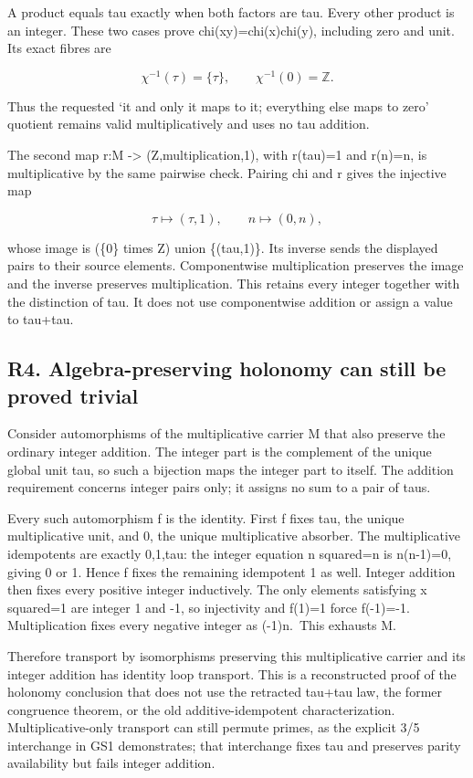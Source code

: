 \documentclass[
]{article}
\begin{document}
A product equals tau exactly when both factors are tau. Every other
product is an integer. These two cases prove chi(xy)=chi(x)chi(y),
including zero and unit. Its exact fibres are

\[
\chi^{-1}(\tau)=\{\tau\},\qquad\chi^{-1}(0)=\mathbb Z.
\tag{R3.2}
\]

Thus the requested `it and only it maps to it; everything else maps to
zero' quotient remains valid multiplicatively and uses no tau addition.

The second map r:M -\textgreater{} (Z,multiplication,1), with r(tau)=1
and r(n)=n, is multiplicative by the same pairwise check. Pairing chi
and r gives the injective map

\[
\tau\mapsto(\tau,1),\qquad n\mapsto(0,n),
\tag{R3.3}
\]

whose image is (\{0\} times Z) union \{(tau,1)\}. Its inverse sends the
displayed pairs to their source elements. Componentwise multiplication
preserves the image and the inverse preserves multiplication. This
retains every integer together with the distinction of tau. It does not
use componentwise addition or assign a value to tau+tau.

\subsection{R4. Algebra-preserving holonomy can still be proved
trivial}\label{r4.-algebra-preserving-holonomy-can-still-be-proved-trivial}

Consider automorphisms of the multiplicative carrier M that also
preserve the ordinary integer addition. The integer part is the
complement of the unique global unit tau, so such a bijection maps the
integer part to itself. The addition requirement concerns integer pairs
only; it assigns no sum to a pair of taus.

Every such automorphism f is the identity. First f fixes tau, the unique
multiplicative unit, and 0, the unique multiplicative absorber. The
multiplicative idempotents are exactly 0,1,tau: the integer equation n
squared=n is n(n-1)=0, giving 0 or 1. Hence f fixes the remaining
idempotent 1 as well. Integer addition then fixes every positive integer
inductively. The only elements satisfying x squared=1 are integer 1 and
-1, so injectivity and f(1)=1 force f(-1)=-1. Multiplication fixes every
negative integer as (-1)n.~This exhausts M.

Therefore transport by isomorphisms preserving this multiplicative
carrier and its integer addition has identity loop transport. This is a
reconstructed proof of the holonomy conclusion that does not use the
retracted tau+tau law, the former congruence theorem, or the old
additive-idempotent characterization. Multiplicative-only transport can
still permute primes, as the explicit 3/5 interchange in GS1
demonstrates; that interchange fixes tau and preserves parity
availability but fails integer addition.
\end{document}
